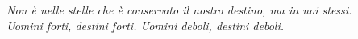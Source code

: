 
\textit{Non è nelle stelle che è conservato il nostro destino, ma in noi stessi.\\Uomini forti, destini forti. Uomini deboli, destini deboli.}
